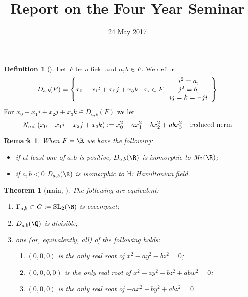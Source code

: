 \documentclass[a4paper,12pt]{article}
\title{Report on the Four Year Seminar}
\date{24 May 2017}
\newtheorem{theorem}{Theorem}
\newtheorem{remark}{Remark}
\theoremstyle{definition}
\newtheorem{definition}{Definition}
\begin{document}
\maketitle
\begin{definition}[{\cite[2.2]{bergeron2016spectrum}}]
	Let $F$ be a field and $a,b\in F$. We define\begin{equation*}
		D_{a,b}(F)=\left\{ x_0+x_1i+x_2j+x_3k\mid x_i\in F,\begin{array}[]{c}
		i^2=a,\\ j^2=b,\\ ij=k=-ji
	\end{array}\right\}
	\end{equation*}
	For $x_0+x_1i+x_2j+x_3k\in D_{a,b}(F)$ we let\begin{equation*}
		N_{\mbox{\scriptsize red}}\left(  x_0+x_1i+x_2j+x_3k\right):=x_0^2-ax_1^2-bx_2^2+abx_3^2\quad\mbox{:reduced norm}
	\end{equation*}
\end{definition}
\begin{remark}
	When $F=\R$ we have the following:\begin{itemize}
		\item if at least one of $a,b$ is positive, $D_{a,b}(\R)$ is isomorphic to $M_2(\R)$;
		\item if $a,b<0$ $D_{a,b}(\R)$ is isomorphic to $\mathbb{H}$: Hamiltonian field.
	\end{itemize}
\end{remark}
\begin{theorem}[main, {\cite[Thm. 2.3, 3.]{bergeron2016spectrum}}]
	The following are equivalent:
	\begin{enumerate}
		\item $\Gamma_{a,b}\subset G:=\mbox{\normalfont SL}_2(\R)$ is cocompact;\label{item1}
		\item $D_{a,b}(\Q)$ is divisible;\label{item2}
		\item one (or, equivalently, all) of the following holds:\label{item3}\begin{enumerate}
				\item $(0,0,0)$ is the only real root of $x^2-ay^2-bz^2=0$;\label{itema}
				\item $(0,0,0,0)$ is the only real root of $x^2-ay^2-bz^2+abw^2=0$; \label{itemb}
				\item $(0,0,0)$ is the only real root of $-ax^2-by^2+abz^2=0$.\label{itemc}
			\end{enumerate}
	\end{enumerate}
\end{theorem}
\end{document}
